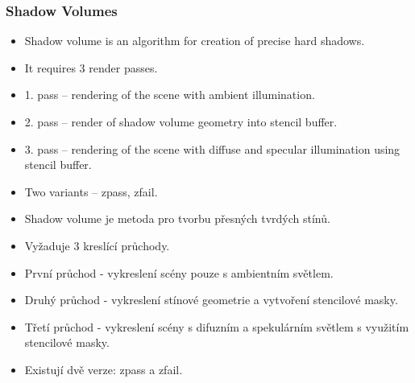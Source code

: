 \begin{frame}\frametitle{Shadow Volumes}\scriptsize
\begin{itemize}
  \item Shadow volume is an algorithm for creation of precise hard shadows.
  \item It requires 3 render passes.
  \item 1. pass -- rendering of the scene with ambient illumination.
  \item 2. pass -- render of shadow volume geometry into stencil buffer.
  \item 3. pass -- rendering of the scene with diffuse and specular illumination using stencil buffer.
  \item Two variants -- zpass, zfail.
\end{itemize}

\begin{itemize}
  \item Shadow volume je metoda pro tvorbu přesných tvrdých stínů.
  \item Vyžaduje 3 kreslící průchody.
  \item První průchod - vykreslení scény pouze s ambientním světlem.
  \item Druhý průchod - vykreslení stínové geometrie a vytvoření stencilové masky.
  \item Třetí průchod - vykreslení scény s difuzním a spekulárním světlem s využitím stencilové masky.
  \item Existují dvě verze: zpass a zfail.
\end{itemize}
\end{frame}

